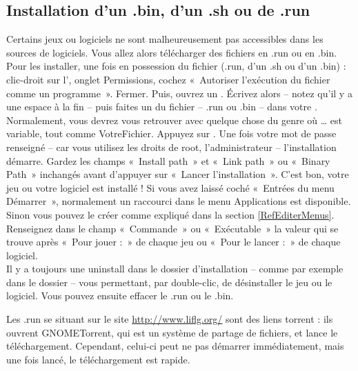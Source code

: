 \subsection{Installation d'un .bin, d'un .sh ou de .run}
Certains jeux ou logiciels ne sont malheureusement pas accessibles dans les sources de logiciels. Vous allez alors télécharger des fichiers en .run ou en .bin. Pour les installer, une fois en possession du fichier (.run, d'un .sh ou d'un .bin) : clic-droit sur l', onglet Permissions, cochez  «~Autoriser l'exécution du fichier comme un programme~». Fermer. Puis, ouvrez un . Écrivez alors  -- notez qu'il y a une espace à la fin -- puis faites un  du fichier -- .run ou .bin -- dans votre . Normalement, vous devrez vous retrouver avec quelque chose du genre  où \ldots{} est variable, tout comme VotreFichier. Appuyez sur . Une fois votre mot de passe renseigné -- car vous utilisez les droits de root, l'administrateur -- l'installation démarre. Gardez les champs «~Install path~» et «~Link path~» ou «~Binary Path~» inchangés avant d'appuyer sur «~Lancer l'installation~». C'est bon, votre jeu ou votre logiciel est installé ! Si vous avez laissé coché «~Entrées du menu Démarrer~», normalement un raccourci dans le menu Applications est disponible. Sinon vous pouvez le créer comme expliqué dans la section \ref{RefEditerMenus}. Renseignez dans le champ «~Commande~» ou «~Exécutable~» la valeur qui se trouve après «~Pour jouer :~» de chaque jeu ou «~Pour le lancer :~» de chaque logiciel.\\
Il y a toujours une  uninstall dans le dossier d'installation -- comme par exemple dans le dossier  -- vous permettant, par double-clic, de désinstaller le jeu ou le logiciel. Vous pouvez ensuite effacer le .run ou le .bin.\par
\begin{nota}
Les .run se situant sur le site \url{http://www.liflg.org/} sont des liens torrent : ils ouvrent GNOMETorrent, qui est un système de partage de fichiers, et lance le téléchargement. Cependant, celui-ci peut ne pas démarrer immédiatement, mais une fois lancé, le téléchargement est rapide.
\end{nota}
